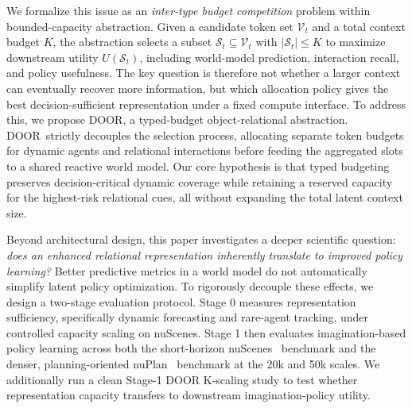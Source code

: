 \documentclass[10pt,journal,compsoc]{IEEEtran}
\newcommand{\method}{\textsc{DOOR}}
\begin{document}
We formalize this issue as an \emph{inter-type budget competition} problem within bounded-capacity abstraction. Given a candidate token set $\mathcal{V}_t$ and a total context budget $K$, the abstraction selects a subset $\mathcal{S}_t \subseteq \mathcal{V}_t$ with $|\mathcal{S}_t|\le K$ to maximize downstream utility $U(\mathcal{S}_t)$, including world-model prediction, interaction recall, and policy usefulness. The key question is therefore not whether a larger context can eventually recover more information, but which allocation policy gives the best decision-sufficient representation under a fixed compute interface. To address this, we propose \method, a typed-budget object-relational abstraction. \method\ strictly decouples the selection process, allocating separate token budgets for dynamic agents and relational interactions before feeding the aggregated slots to a shared reactive world model. Our core hypothesis is that typed budgeting preserves decision-critical dynamic coverage while retaining a reserved capacity for the highest-risk relational cues, all without expanding the total latent context size.

Beyond architectural design, this paper investigates a deeper scientific question: \emph{does an enhanced relational representation inherently translate to improved policy learning?} Better predictive metrics in a world model do not automatically simplify latent policy optimization. To rigorously decouple these effects, we design a two-stage evaluation protocol. Stage 0 measures representation sufficiency, specifically dynamic forecasting and rare-agent tracking, under controlled capacity scaling on nuScenes. Stage 1 then evaluates imagination-based policy learning across both the short-horizon nuScenes~\cite{caesar2020nuscenes} benchmark and the denser, planning-oriented nuPlan~\cite{caesar2021nuplan} benchmark at the 20k and 50k scales. We additionally run a clean Stage-1 DOOR K-scaling study to test whether representation capacity transfers to downstream imagination-policy utility.
\end{document}
